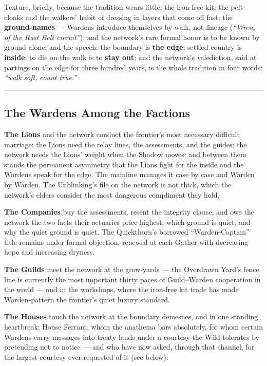 Texture, briefly, because the tradition wears little: the iron-free kit; the pelt-cloaks and the walkers' habit of dressing in layers that come off fast; the \textbf{ground-names} --- Wardens introduce themselves by walk, not lineage (\textit{``Wren, of the Rust Belt circuit''}), and the network's rare formal honor is to be known by ground alone; and the speech: the boundary is \textbf{the edge}; settled country is \textbf{inside}; to die on the walk is to \textbf{stay out}; and the network's valediction, said at partings on the edge for three hundred years, is the whole tradition in four words: \textit{``walk soft, count true.''}

\medskip\hrule\medskip

\subsection{The Wardens Among the Factions}

\textbf{The Lions} and the network conduct the frontier's most necessary difficult marriage: the Lions need the relay lines, the assessments, and the guides; the network needs the Lions' weight when the Shadow moves; and between them stands the permanent asymmetry that the Lions fight for the inside and the Wardens speak for the edge. The mainline manages it case by case and Warden by Warden. The Unblinking's file on the network is not thick, which the network's elders consider the most dangerous compliment they hold.

\textbf{The Companies} buy the assessments, resent the integrity clause, and owe the network the two facts their actuaries price highest: which ground is quiet, and why the quiet ground is quiet. The Quickthorn's borrowed ``Warden-Captain'' title remains under formal objection, renewed at each Gather with decreasing hope and increasing dryness.

\textbf{The Guilds} meet the network at the grow-yards --- the Overdrawn Yard's fence line is currently the most important thirty paces of Guild--Warden cooperation in the world --- and in the workshops, where the iron-free kit trade has made Warden-pattern the frontier's quiet luxury standard.

\textbf{The Houses} touch the network at the boundary demesnes, and in one standing heartbreak: House Ferrant, whom the anathema bars absolutely, for whom certain Wardens carry messages into treaty lands under a courtesy the Wild tolerates by pretending not to notice --- and who have now asked, through that channel, for the largest courtesy ever requested of it (see below).

